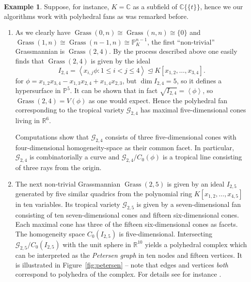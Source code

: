 \documentclass[
  paper=a4,
  titlepage,
  bibliography=totoc,
  pagesize=pdftex
]{scrartcl}
\numberwithin{figure}{section}
\numberwithin{equation}{section}
\numberwithin{table}{section}
\newcommand*\setR{\mathds{R}}
\newcommand*\setC{\mathds{C}}
\newcommand*\setP{\mathds{P}}
\newcommand*\ideal[1]{\left\langle #1 \right\rangle}
\newcommand*\puiseux[2]{#1\{\!\{#2\}\!\}}
\newcommand*\CCt{\puiseux{\setC}{t}}
\let\idealof\trianglelefteq
\DeclareMathOperator{\Grass}{Grass}
\theoremstyle{definition}
\newtheorem{example}[definition]{Example}
\numberwithin{definition}{section}
\begin{document}
\begin{example} \label{ex:tropGrass}
  Suppose, for instance, $K = \setC$ as a subfield of $\CCt$, hence we our algorithms work
  with polyhedral fans as was remarked before.
  \begin{enumerate}
    \item As we clearly have $\Grass(0,n) \cong \Grass(n,n) \cong \{0\}$ and $\Grass(1,n)
      \cong \Grass(n-1, n) \cong \setP_K^{n-1}$, the first \enquote{non-trivial}
      Grassmannian is $\Grass(2,4)$. By the process described above one easily finds that
      $\Grass(2,4)$ is given by the ideal
      \[
        I_{2,4} = \ideal{ x_{i,j} \phi : 1 \leq i < j \leq 4 }
        \idealof K[x_{1,2}, \dots, x_{3,4}].
      \]
      for $\phi = x_{1,2}x_{3,4} - x_{1,3}x_{2,4} + x_{1,4}x_{2,3}$, but $\dim I_{2,4} =
      5$, so it defines a hypersurface in $\setP^5$. It can be shown that in fact
      $\sqrt{I_{2,4}} = \ideal \phi$, so $\Grass(2,4) = V(\phi)$ as one would expect.
      Hence the polyhedral fan corresponding to the tropical variety $\mathcal G_{2,4}$
      has maximal five-dimensional cones living in $\setR^6$.

      Computations show that $\mathcal G_{2,4}$ consists of three five-dimensional cones
      with four-dimensional homogeneity-space as their common facet. In particular,
      $\mathcal G_{2,4}$ is combinatorially a curve and $\mathcal G_{2,4}/C_0(\phi)$ is a
      tropical line consisting of three rays from the origin.
    \item The next non-trivial Grassmannian $\Grass(2,5)$ is given by an ideal $I_{2,5}$
      generated by five similar quadrics from the polynomial ring $K[x_{1,2}, \dots,
      x_{4,5}]$ in ten variables. Its tropical variety $\mathcal G_{2,5}$ is given by a
      seven-dimensional fan consisting of ten seven-dimensional cones and fifteen
      six-dimensional cones. Each maximal cone has three of the fifteen six-dimensional
      cones as facets. The homogeneity space $C_0(I_{2,5})$ is five-dimensional.
      Intersecting $\mathcal G_{2,5}/C_0(I_{2,5})$ with the unit sphere in $\setR^{10}$
      yields a polyhedral complex which can be interpreted as the \emph{Petersen graph} in
      ten nodes and fifteen vertices. It is illustrated in Figure~\ref{fig:petersen} --
      note that edges and vertices \emph{both} correspond to polyhedra of the complex.
      For details see for instance \cite[Example~9.10]{sturmSolve}.
  \end{enumerate}
\end{example}
\end{document}
